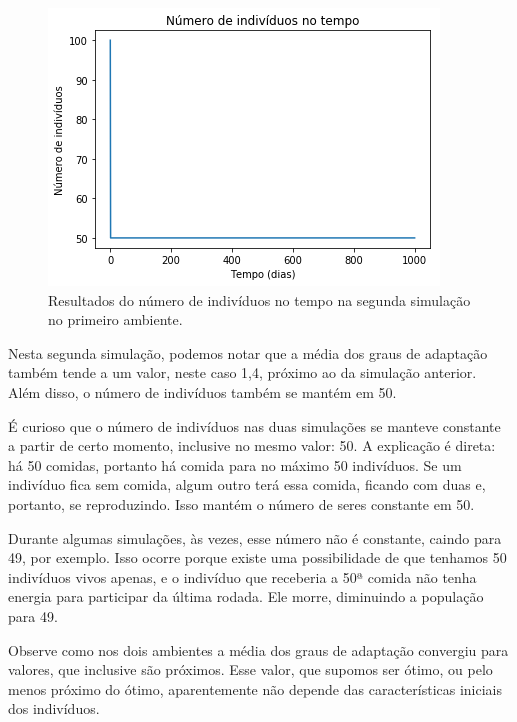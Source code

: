 \documentclass[10pt,brazil,english]{article}
\begin{document}
            \begin{figure}[!hbtp]
                \begin{center}
                    \includegraphics[scale=0.5]{Images/1-6.png}
                \end{center}
                \caption{Resultados do número de indivíduos no tempo na segunda simulação no primeiro ambiente.}
                \label{Fig6}
            \end{figure}
            
            Nesta segunda simulação, podemos notar que a média dos graus de adaptação também tende a um valor, neste caso 1,4, próximo ao da simulação anterior. Além disso, o número de indivíduos também se mantém em 50.
            
            É curioso que o número de indivíduos nas duas simulações se manteve constante a partir de certo momento, inclusive no mesmo valor: 50. A explicação é direta: há 50 comidas, portanto há comida para no máximo 50 indivíduos. Se um indivíduo fica sem comida, algum outro terá essa comida, ficando com duas e, portanto, se reproduzindo. Isso mantém o número de seres constante em 50.
            
            Durante algumas simulações, às vezes, esse número não é constante, caindo para 49, por exemplo. Isso ocorre porque existe uma possibilidade de que tenhamos 50 indivíduos vivos apenas, e o indivíduo que receberia a 50ª comida não tenha energia para participar da última rodada. Ele morre, diminuindo a população para 49.
            
            Observe como nos dois ambientes a média dos graus de adaptação convergiu para valores, que inclusive são próximos. Esse valor, que supomos ser ótimo, ou pelo menos próximo do ótimo, aparentemente não depende das características iniciais dos indivíduos.
            
\end{document}
